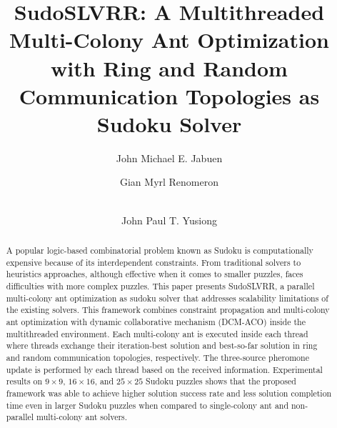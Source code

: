 \documentclass[runningheads]{llncs}
\begin{document}
%
\title{SudoSLVRR: A Multithreaded Multi-Colony Ant Optimization with Ring and Random Communication Topologies as Sudoku Solver}
%
%
\author{John Michael E. Jabuen \and
Gian Myrl Renomeron \and \\John Paul T. Yusiong}


%
\maketitle              %
%
\begin{abstract}
    A popular logic-based combinatorial problem known as Sudoku is computationally expensive because of its interdependent constraints. From traditional solvers to heuristics approaches, although effective when it comes to smaller puzzles, faces difficulties with more complex puzzles. This paper presents SudoSLVRR, a parallel multi-colony ant optimization as sudoku solver that addresses scalability limitations of the existing solvers. This framework combines constraint propagation and multi-colony ant optimization with dynamic collaborative mechanism (DCM-ACO) inside the multithreaded environment. Each multi-colony ant is executed inside each thread where threads exchange their iteration-best solution and best-so-far solution in ring and random communication topologies, respectively. The three-source pheromone update is performed by each thread based on the received information. Experimental results on $9 \times 9$, $16 \times 16$, and $25 \times 25$ Sudoku puzzles shows that the proposed framework was able to achieve higher solution success rate and less solution completion time even in larger Sudoku puzzles when compared to single-colony ant and non-parallel multi-colony ant solvers. 



\end{abstract}
%
%
%
\end{document}
